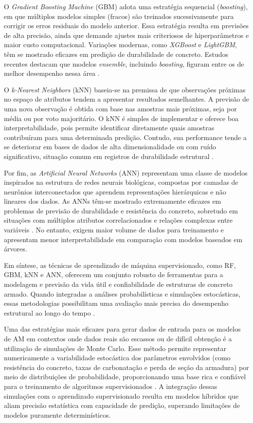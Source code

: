 O \textit{Gradient Boosting Machine} (GBM) adota uma estratégia sequencial (\textit{boosting}), em que múltiplos modelos simples (fracos) são treinados sucessivamente para corrigir os erros residuais do modelo anterior. Essa estratégia resulta em previsões de alta precisão, ainda que demande ajustes mais criteriosos de hiperparâmetros e maior custo computacional. Variações modernas, como \textit{XGBoost} e \textit{LightGBM}, têm se mostrado eficazes em predição de durabilidade de concreto. Estudos recentes destacam que modelos \textit{ensemble}, incluindo \textit{boosting}, figuram entre os de melhor desempenho nessa área \cite{taffese2025}.

O \textit{k-Nearest Neighbors} (kNN) baseia-se na premissa de que observações próximas no espaço de atributos tendem a apresentar resultados semelhantes. A previsão de uma nova observação é obtida com base nas amostras mais próximas, seja por média ou por voto majoritário. O kNN é simples de implementar e oferece boa interpretabilidade, pois permite identificar diretamente quais amostras contribuíram para uma determinada predição. Contudo, sua performance tende a se deteriorar em bases de dados de alta dimensionalidade ou com ruído significativo, situação comum em registros de durabilidade estrutural \cite{mandal2024}.

Por fim, as \textit{Artificial Neural Networks} (ANN) representam uma classe de modelos inspirados na estrutura de redes neurais biológicas, compostas por camadas de neurônios interconectados que aprendem representações hierárquicas e não lineares dos dados. As ANNs têm-se mostrado extremamente eficazes em problemas de previsão de durabilidade e resistência do concreto, sobretudo em situações com múltiplos atributos correlacionados e relações complexas entre variáveis \cite{taffese2025}. No entanto, exigem maior volume de dados para treinamento e apresentam menor interpretabilidade em comparação com modelos baseados em árvores.

Em síntese, as técnicas de aprendizado de máquina supervisionado, como RF, GBM, kNN e ANN, oferecem um conjunto robusto de ferramentas para a modelagem e previsão da vida útil e confiabilidade de estruturas de concreto armado. Quando integradas a análises probabilísticas e simulações estocásticas, essas metodologias possibilitam uma avaliação mais precisa do desempenho estrutural ao longo do tempo \cite{zhang_machine_2025, shaqadan2016, taffese2025, mandal2024}.

Uma das estratégias mais eficazes para gerar dados de entrada para os modelos de AM em contextos onde dados reais são escassos ou de difícil obtenção é a utilização de simulações de Monte Carlo. Esse método permite representar numericamente a variabilidade estocástica dos parâmetros envolvidos (como resistência do concreto, taxas de carbonatação e perda de seção da armadura) por meio de distribuições de probabilidade, proporcionando uma base rica e confiável para o treinamento de algoritmos supervisionados \cite{pereira_junior_reliability_2023}. A integração dessas simulações com o aprendizado supervisionado resulta em modelos híbridos que aliam precisão estatística com capacidade de predição, superando limitações de modelos puramente determinísticos.

